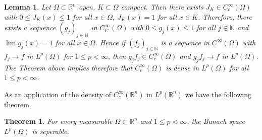 \documentclass[11pt,a4paper]{article}
\newtheorem{lem}{Lemma}[section]
\newtheorem{thm}{Theorem}[section]
\theoremstyle{definition}
\begin{document}
\begin{lem} Let $\Omega \subset \mathbb{R}^n$ open, $K \subset \Omega$ compact. Then there exists $J_K \in C_c^\infty( \Omega)$ with $0 \leq J_K(x) \leq 1$ for all $x \in \Omega, \ J_K(x)=1$ for all $x \in K$. Therefore, there exists a sequence $(g_j)_{j \in \mathbb{N}}$ in $C_C^\infty( \Omega)$ with $0 \leq g_j(x) \leq 1$ for all $j \in \mathbb{N}$ and $\lim g_j(x) = 1$ for all $x \in \Omega$. Hence if $(f_j)_{j \in \mathbb{N}}$ is a sequence in $C^\infty( \Omega)$ with $f_j \to f$ in $L^p( \Omega)$ for $1 \leq p < \infty$, then $g_jf_j \in C_c^\infty( \Omega)$ and $g_jf_j \to f$ in $L^p( \Omega)$. The Theorem above implies therefore that $C_c^\infty(\Omega)$ is dense in $L^p( \Omega)$ for all $1 \leq p < \infty$.
\end{lem}
As an application of the density of $C_c^\infty( \mathbb{R}^n) $ in $L^p( \mathbb{R}^n)$ we have the following theorem.
\begin{thm} For every measurable $\Omega \subset \mathbb{R}^n$ and $1 \leq p < \infty$, the Banach space $L^p( \Omega)$ is seperable. 
\end{thm}
\end{document}
